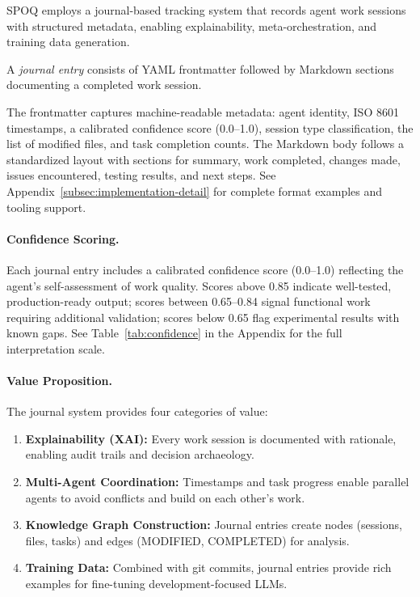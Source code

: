 SPOQ employs a journal-based tracking system that records agent work sessions
with structured metadata, enabling explainability, meta-orchestration, and
training data generation.

\begin{definition}
\label{def:journal-entry}
A \textit{journal entry} consists of YAML frontmatter followed by Markdown
sections documenting a completed work session.
\end{definition}

The frontmatter captures machine-readable metadata: agent identity, ISO 8601
timestamps, a calibrated confidence score (0.0--1.0), session type classification,
the list of modified files, and task completion counts. The Markdown body follows
a standardized layout with sections for summary, work completed, changes made,
issues encountered, testing results, and next steps. See
Appendix~\ref{subsec:implementation-detail} for complete format examples and
tooling support.

\paragraph{Confidence Scoring.}
Each journal entry includes a calibrated confidence score (0.0--1.0) reflecting
the agent's self-assessment of work quality. Scores above 0.85 indicate
well-tested, production-ready output; scores between 0.65--0.84 signal
functional work requiring additional validation; scores below 0.65 flag
experimental results with known gaps. See Table~\ref{tab:confidence} in the
Appendix for the full interpretation scale.

\paragraph{Value Proposition.}
The journal system provides four categories of value:

\begin{enumerate}
    \item \textbf{Explainability (XAI):} Every work session is documented with
    rationale, enabling audit trails and decision archaeology.

    \item \textbf{Multi-Agent Coordination:} Timestamps and task progress enable
    parallel agents to avoid conflicts and build on each other's work.

    \item \textbf{Knowledge Graph Construction:} Journal entries create nodes
    (sessions, files, tasks) and edges (MODIFIED, COMPLETED) for analysis.

    \item \textbf{Training Data:} Combined with git commits, journal entries
    provide rich examples for fine-tuning development-focused LLMs.
\end{enumerate}

